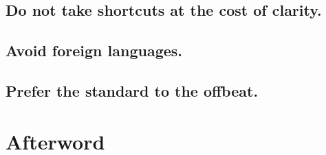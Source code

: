 \documentclass{article}
\numberwithin{equation}{section}
\begin{document}

\subsection{Do not take shortcuts at the cost of clarity.}


\subsection{Avoid foreign languages.}


\subsection{Prefer the standard to the offbeat.}


\section{Afterword}


\printbibliography[heading=bibintoc]
	
\end{document}
